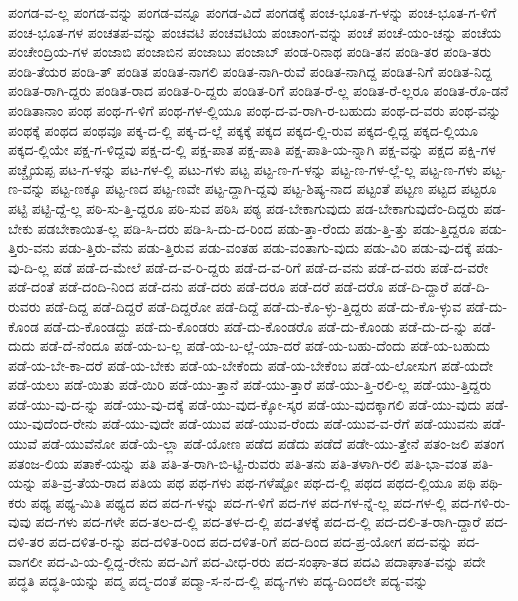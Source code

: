 {ಪಂಗಡ-ವ-ಲ್ಲ
ಪಂಗಡ-ವನ್ನು
ಪಂಗಡ-ವನ್ನೂ
ಪಂಗಡ-ವಿದೆ
ಪಂಗಡಕ್ಕೆ
ಪಂಚ-ಭೂತ-ಗ-ಳನ್ನು
ಪಂಚ-ಭೂತ-ಗ-ಳಿಗೆ
ಪಂಚ-ಭೂತ-ಗಳ
ಪಂಚತಪ-ವನ್ನು
ಪಂಚವಟಿ
ಪಂಚವಟಿಯ
ಪಂಚಾಂಗ-ವನ್ನು
ಪಂಚೆ
ಪಂಚೆ-ಯಂ-ಚನ್ನು
ಪಂಚೆಯ
ಪಂಚೇಂದ್ರಿಯ-ಗಳ
ಪಂಜಾಬಿ
ಪಂಜಾಬಿನ
ಪಂಜಾಬು
ಪಂಜಾಬ್
ಪಂಡ-ರಿನಾಥ
ಪಂಡಿ-ತನ
ಪಂಡಿ-ತರ
ಪಂಡಿ-ತರು
ಪಂಡಿ-ತೆಯರ
ಪಂಡಿ-ತ್
ಪಂಡಿತ
ಪಂಡಿತ-ನಾಗಲಿ
ಪಂಡಿತ-ನಾಗಿ-ರುವೆ
ಪಂಡಿತ-ನಾಗಿದ್ದ
ಪಂಡಿತ-ನಿಗೆ
ಪಂಡಿತ-ನಿದ್ದ
ಪಂಡಿತ-ರಾಗಿ-ದ್ದರು
ಪಂಡಿತ-ರಾದ
ಪಂಡಿತ-ರಿ-ದ್ದರು
ಪಂಡಿತ-ರಿಗೆ
ಪಂಡಿತ-ರೆ-ಲ್ಲ
ಪಂಡಿತ-ರೆ-ಲ್ಲರೂ
ಪಂಡಿತ-ರೊ-ಡನೆ
ಪಂಡಿತಾನಾಂ
ಪಂಥ
ಪಂಥ-ಗ-ಳಿಗೆ
ಪಂಥ-ಗಳ-ಲ್ಲಿಯೂ
ಪಂಥ-ದ-ವ-ರಾಗಿ-ರ-ಬಹುದು
ಪಂಥ-ದ-ವರು
ಪಂಥ-ವನ್ನು
ಪಂಥಕ್ಕೆ
ಪಂಥದ
ಪಂಥವೂ
ಪಕ್ಕ-ದ-ಲ್ಲಿ
ಪಕ್ಕ-ದ-ಲ್ಲೆ
ಪಕ್ಕಕ್ಕೆ
ಪಕ್ಕದ
ಪಕ್ಕದ-ಲ್ಲಿ-ರುವ
ಪಕ್ಕದ-ಲ್ಲಿದ್ದ
ಪಕ್ಕದ-ಲ್ಲಿಯೂ
ಪಕ್ಕದ-ಲ್ಲಿಯೇ
ಪಕ್ಷ-ಗ-ಳಿದ್ದವು
ಪಕ್ಷ-ದ-ಲ್ಲಿ
ಪಕ್ಷ-ಪಾತ
ಪಕ್ಷ-ಪಾತಿ
ಪಕ್ಷ-ಪಾತಿ-ಯ-ನ್ನಾಗಿ
ಪಕ್ಷ-ವನ್ನು
ಪಕ್ಷದ
ಪಕ್ಷಿ-ಗಳ
ಪಚ್ಚೈಯಪ್ಪ
ಪಟ-ಗ-ಳನ್ನು
ಪಟ-ಗಳ-ಲ್ಲಿ
ಪಟು-ಗಳು
ಪಟ್ಟ
ಪಟ್ಟ-ಣ-ಗ-ಳನ್ನು
ಪಟ್ಟ-ಣ-ಗಳ-ಲ್ಲೆ-ಲ್ಲ
ಪಟ್ಟ-ಣ-ಗಳು
ಪಟ್ಟ-ಣ-ವನ್ನು
ಪಟ್ಟ-ಣಕ್ಕೂ
ಪಟ್ಟ-ಣದ
ಪಟ್ಟ-ಣವೇ
ಪಟ್ಟ-ದ್ದಾಗಿ-ದ್ದವು
ಪಟ್ಟ-ಶಿಷ್ಯ-ನಾದ
ಪಟ್ಟಂತೆ
ಪಟ್ಟಣ
ಪಟ್ಟದ
ಪಟ್ಟರೂ
ಪಟ್ಟಿ
ಪಟ್ಟಿ-ದ್ದೆ-ಲ್ಲ
ಪಠಿ-ಸು-ತ್ತಿ-ದ್ದರೂ
ಪಠಿ-ಸುವ
ಪಠಿಸಿ
ಪಠ್ಯ
ಪಡ-ಬೇಕಾಗುವುದು
ಪಡ-ಬೇಕಾಗುವುದೆಂ-ದಿದ್ದರು
ಪಡ-ಬೇಕು
ಪಡಬೇಕಾಯಿತ-ಲ್ಲ
ಪಡಿ-ಸಿ-ದರು
ಪಡಿ-ಸಿ-ದು-ದ-ರಿಂದ
ಪಡು-ತ್ತಾ-ರೆಂದು
ಪಡು-ತ್ತಿ-ತ್ತು
ಪಡು-ತ್ತಿದ್ದರೂ
ಪಡು-ತ್ತಿರು-ವನು
ಪಡು-ತ್ತಿರು-ವೆನು
ಪಡು-ತ್ತಿರುವ
ಪಡು-ವಂತಹ
ಪಡು-ವಂತಾಗು-ವುದು
ಪಡು-ವಿರಿ
ಪಡು-ವು-ದಕ್ಕೆ
ಪಡು-ವು-ದಿ-ಲ್ಲ
ಪಡೆ
ಪಡೆ-ದ-ಮೇಲೆ
ಪಡೆ-ದ-ವ-ರಿ-ದ್ದರು
ಪಡೆ-ದ-ವ-ರಿಗೆ
ಪಡೆ-ದ-ವನು
ಪಡೆ-ದ-ವರು
ಪಡೆ-ದ-ವರೇ
ಪಡೆ-ದಂತೆ
ಪಡೆ-ದಂದಿ-ನಿಂದ
ಪಡೆ-ದನು
ಪಡೆ-ದರು
ಪಡೆ-ದರೂ
ಪಡೆ-ದರೆ
ಪಡೆ-ದರೊ
ಪಡೆ-ದಿ-ದ್ದಾರೆ
ಪಡೆ-ದಿ-ರುವರು
ಪಡೆ-ದಿದ್ದ
ಪಡೆ-ದಿದ್ದರೆ
ಪಡೆ-ದಿದ್ದರೋ
ಪಡೆ-ದಿದ್ದೆ
ಪಡೆ-ದು-ಕೊ-ಳ್ಳು-ತ್ತಿದ್ದರು
ಪಡೆ-ದು-ಕೊ-ಳ್ಳುವ
ಪಡೆ-ದು-ಕೊಂಡ
ಪಡೆ-ದು-ಕೊಂಡದ್ದು
ಪಡೆ-ದು-ಕೊಂಡರು
ಪಡೆ-ದು-ಕೊಂಡರೊ
ಪಡೆ-ದು-ಕೊಂಡು
ಪಡೆ-ದು-ದ-ನ್ನು
ಪಡೆ-ದುದು
ಪಡೆ-ದೆ-ನೆಂದೂ
ಪಡೆ-ಯ-ಬ-ಲ್ಲ
ಪಡೆ-ಯ-ಬ-ಲ್ಲೆ-ಯಾ-ದರೆ
ಪಡೆ-ಯ-ಬಹು-ದೆಂದು
ಪಡೆ-ಯ-ಬಹುದು
ಪಡೆ-ಯ-ಬೇ-ಕಾ-ದರೆ
ಪಡೆ-ಯ-ಬೇಕು
ಪಡೆ-ಯ-ಬೇಕೆಂದು
ಪಡೆ-ಯ-ಬೇಕೆಂಬ
ಪಡೆ-ಯ-ಲೋಸುಗ
ಪಡೆ-ಯದೇ
ಪಡೆ-ಯಲು
ಪಡೆ-ಯಿತು
ಪಡೆ-ಯಿರಿ
ಪಡೆ-ಯು-ತ್ತಾನೆ
ಪಡೆ-ಯು-ತ್ತಾರೆ
ಪಡೆ-ಯು-ತ್ತಿ-ರಲಿ-ಲ್ಲ
ಪಡೆ-ಯು-ತ್ತಿದ್ದರು
ಪಡೆ-ಯು-ವು-ದ-ನ್ನು
ಪಡೆ-ಯು-ವು-ದಕ್ಕೆ
ಪಡೆ-ಯು-ವುದ-ಕ್ಕೋ-ಸ್ಕರ
ಪಡೆ-ಯು-ವುದಕ್ಕಾಗಲಿ
ಪಡೆ-ಯು-ವುದು
ಪಡೆ-ಯು-ವುದೆಂದ-ರೇನು
ಪಡೆ-ಯು-ವುದೇ
ಪಡೆ-ಯುವ
ಪಡೆ-ಯುವ-ರೆಂದು
ಪಡೆ-ಯುವ-ವ-ರೆಗೆ
ಪಡೆ-ಯುವನು
ಪಡೆ-ಯುವೆ
ಪಡೆ-ಯುವೆನೋ
ಪಡೆ-ಯೆ-ಲ್ಲಾ
ಪಡೆ-ಯೋಣ
ಪಡೆದ
ಪಡೆದು
ಪಡೆದೆ
ಪಡೇ-ಯು-ತ್ತೇನೆ
ಪತಂ-ಜಲಿ
ಪತಂಗ
ಪತಂಜ-ಲಿಯ
ಪತಾಕೆ-ಯನ್ನು
ಪತಿ
ಪತಿ-ತ-ರಾಗಿ-ಬಿ-ಟ್ಟಿ-ರುವರು
ಪತಿ-ತನು
ಪತಿ-ತಳಾಗಿ-ರಲಿ
ಪತಿ-ಭಾ-ವಂತ
ಪತಿ-ಯನ್ನು
ಪತಿ-ವ್ರ-ತೆಯ-ರಾದ
ಪತಿಯ
ಪಥ
ಪಥ-ಗಳು
ಪಥ-ಗಳೆಷ್ಟೋ
ಪಥ-ದ-ಲ್ಲಿ
ಪಥದ
ಪಥದ-ಲ್ಲಿಯೂ
ಪಥಿ
ಪಥಿ-ಕರು
ಪಥ್ಯ
ಪಥ್ಯ-ಮಿತಿ
ಪಥ್ಯದ
ಪದ
ಪದ-ಗ-ಳನ್ನು
ಪದ-ಗ-ಳಿಗೆ
ಪದ-ಗಳ
ಪದ-ಗಳ-ನ್ನೆ-ಲ್ಲ
ಪದ-ಗಳ-ಲ್ಲಿ
ಪದ-ಗಳಿ-ರು-ವುವು
ಪದ-ಗಳು
ಪದ-ಗಳೇ
ಪದ-ತಲ-ದ-ಲ್ಲಿ
ಪದ-ತಳ-ದ-ಲ್ಲಿ
ಪದ-ತಳಕ್ಕೆ
ಪದ-ದ-ಲ್ಲಿ
ಪದ-ದಲಿ-ತ-ರಾಗಿ-ದ್ದಾರೆ
ಪದ-ದಳಿ-ತರ
ಪದ-ದಳಿತ-ರ-ನ್ನು
ಪದ-ದಳಿತ-ರಿಂದ
ಪದ-ದಳಿತ-ರಿಗೆ
ಪದ-ದಿಂದ
ಪದ-ಪ್ರ-ಯೋಗ
ಪದ-ವನ್ನು
ಪದ-ವಾಗಲೀ
ಪದ-ವಿ-ಯ-ಲ್ಲಿದ್ದ-ರೇನು
ಪದ-ವಿಗೆ
ಪದ-ವೀಧ-ರರು
ಪದ-ಸಂಘಾ-ತದ
ಪದವಿ
ಪದಾಘಾತ-ವನ್ನು
ಪದೇ
ಪದ್ಧತಿ
ಪದ್ಧತಿ-ಯನ್ನು
ಪದ್ಮ
ಪದ್ಮ-ದಂತೆ
ಪದ್ಮಾ-ಸ-ನ-ದ-ಲ್ಲಿ
ಪದ್ಯ-ಗಳು
ಪದ್ಯ-ದಿಂದಲೇ
ಪದ್ಯ-ವನ್ನು
}

